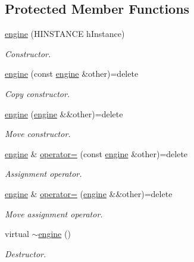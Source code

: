 \subsection*{Protected Member Functions}
\begin{DoxyCompactItemize}
\item 
\hyperlink{classengine_a5f896172ebe9e2461d0f8e4114b1e4ef_a5f896172ebe9e2461d0f8e4114b1e4ef}{engine} (H\+I\+N\+S\+T\+A\+N\+CE h\+Instance)
\begin{DoxyCompactList}\small\item\em Constructor. \end{DoxyCompactList}\item 
\hyperlink{classengine_a70f51e0ad890e3c0b2a474d17d65ef43_a70f51e0ad890e3c0b2a474d17d65ef43}{engine} (const \hyperlink{classengine}{engine} \&other)=delete
\begin{DoxyCompactList}\small\item\em Copy constructor. \end{DoxyCompactList}\item 
\hyperlink{classengine_aca7d19db925fcde9300cfc598ece1e89_aca7d19db925fcde9300cfc598ece1e89}{engine} (\hyperlink{classengine}{engine} \&\&other)=delete
\begin{DoxyCompactList}\small\item\em Move constructor. \end{DoxyCompactList}\item 
\hyperlink{classengine}{engine} \& \hyperlink{classengine_af12cdec3187ce4b86a1b3d9803f4d9da_af12cdec3187ce4b86a1b3d9803f4d9da}{operator=} (const \hyperlink{classengine}{engine} \&other)=delete
\begin{DoxyCompactList}\small\item\em Assignment operator. \end{DoxyCompactList}\item 
\hyperlink{classengine}{engine} \& \hyperlink{classengine_a8eab926fb30101f2dc047bba286c5c76_a8eab926fb30101f2dc047bba286c5c76}{operator=} (\hyperlink{classengine}{engine} \&\&other)=delete
\begin{DoxyCompactList}\small\item\em Move assignment operator. \end{DoxyCompactList}\item 
virtual \hyperlink{classengine_a5c15faa669875b088a7d8a32bb6fcaea_a5c15faa669875b088a7d8a32bb6fcaea}{$\sim$engine} ()
\begin{DoxyCompactList}\small\item\em Destructor. \end{DoxyCompactList}\item 

\end{DoxyCompactItemize}

